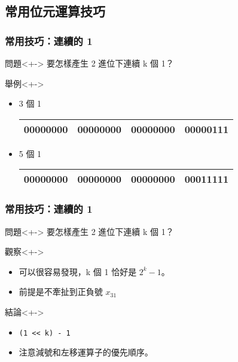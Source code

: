 \documentclass[utf8]{beamer}
\begin{document}
\begin{CJK}{UTF8}{bkai}
\subsection{常用位元運算技巧}

\begin{frame}[fragile]
  \frametitle{常用技巧：連續的 1}
  \begin{block}{問題}<+->
  要怎樣產生 2 進位下連續 k 個 1？
  \end{block}
  \begin{exampleblock}{舉例}<+->
    \begin{itemize}
    \item 3 個 1
      \begin{table}[h]
        \begin{tabular}{|c|c|c|c|}
        \hline
        00000000 & 00000000 & 00000000 & 00000\alert{111}\\
        \hline
        \end{tabular}
      \end{table}
    \item<+-> 5 個 1
      \begin{table}[h]
        \begin{tabular}{|c|c|c|c|}
        \hline
        00000000 & 00000000 & 00000000 & 000\alert{11111}\\
        \hline
        \end{tabular}
      \end{table}
    \end{itemize}
  \end{exampleblock}
\end{frame}

\begin{frame}[fragile]
  \frametitle{常用技巧：連續的 1}
  \begin{block}{問題}<+->
  要怎樣產生 2 進位下連續 k 個 1？
  \end{block}
  \begin{exampleblock}{觀察}<+->
    \begin{itemize}
    \item 可以很容易發現，k 個 1 恰好是 $2^k-1$。
    \item<+-> \alert{前提是不牽扯到正負號 $x_{31}$}
    \end{itemize}
  \end{exampleblock}
  \begin{alertblock}{結論}<+->
    \begin{itemize}
    \item \lstinline{(1 << k) - 1}{}
    \item<+-> 注意減號和左移運算子的優先順序。
    \end{itemize}
  \end{alertblock}
\end{frame}


\end{CJK}
\end{document}
